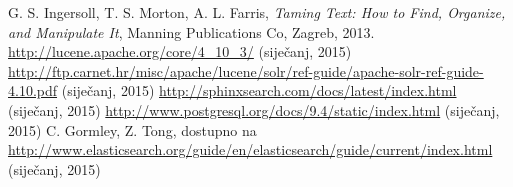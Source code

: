 \documentclass[a4paper,twoside,12pt]{scrreprt}
\begin{document}
\begin{thebibliography}{99}
   G. S. Ingersoll, T. S. Morton, A. L. Farris, \textit{Taming Text: How to Find, Organize, and Manipulate It}, Manning Publications Co, Zagreb, 2013.
   \url{http://lucene.apache.org/core/4_10_3/} (siječanj, 2015)
   \url{http://ftp.carnet.hr/misc/apache/lucene/solr/ref-guide/apache-solr-ref-guide-4.10.pdf} (siječanj, 2015)
   \url{http://sphinxsearch.com/docs/latest/index.html} (siječanj, 2015)
   \url{http://www.postgresql.org/docs/9.4/static/index.html} (siječanj, 2015)
   C. Gormley, Z. Tong, dostupno na \url{http://www.elasticsearch.org/guide/en/elasticsearch/guide/current/index.html} (siječanj, 2015)
\end{thebibliography}

\pagestyle{empty}

\begin{sazetak}
\end{sazetak}

\begin{summary}
\end{summary}

\begin{cv}
\end{cv}
\end{document}
